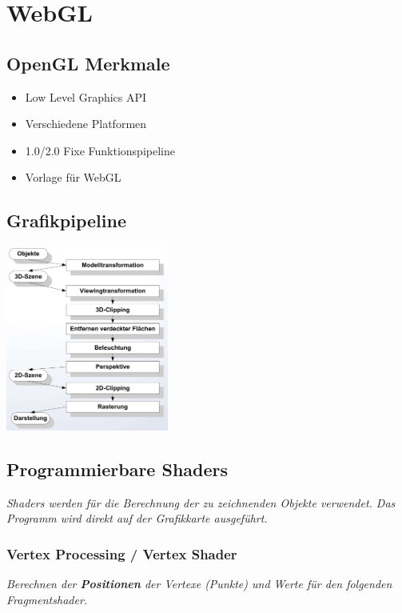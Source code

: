 \section{WebGL}

\subsection{OpenGL Merkmale}

\begin{itemize} \setlength\itemsep{0em}
    \item Low Level Graphics API
    \item Verschiedene Platformen
    \item 1.0/2.0 Fixe Funktionspipeline
    \item Vorlage für WebGL
\end{itemize}

\subsection{Grafikpipeline}

\includegraphics[width=0.4\textwidth]{assets/grafikpipline.png}

\subsection{Programmierbare Shaders}

\textit{
    Shaders werden für die Berechnung der zu zeichnenden
    Objekte verwendet. Das Programm wird direkt auf der Grafikkarte
    ausgeführt.
}

\subsubsection{Vertex Processing / Vertex Shader}

\textit{
    Berechnen der \textbf{Positionen} der Vertexe (Punkte) und
    Werte für den folgenden Fragmentshader.
}

